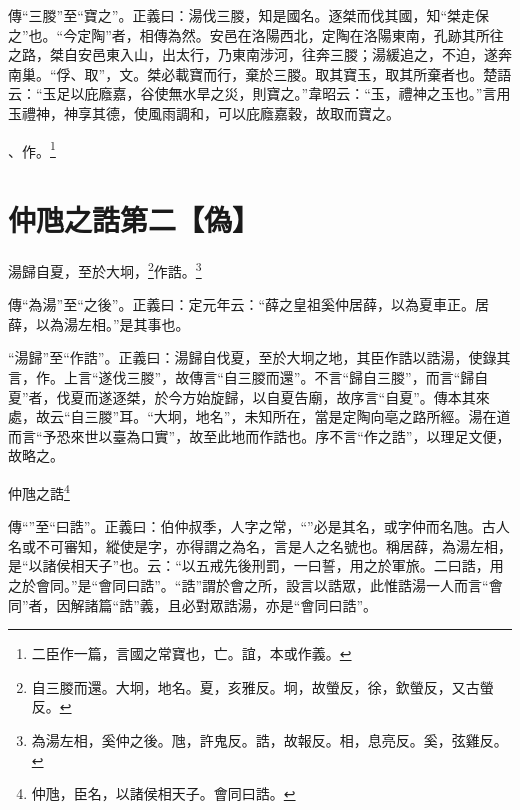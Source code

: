 {\noindent\shu{}\fzkt 傳“三朡”至“寶之”。正義曰：湯伐三朡，知是國名。逐桀而伐其國，知“桀走保之”也。“今定陶”者，相傳為然。安邑在洛陽西北，定陶在洛陽東南，孔跡其所往之路，桀自安邑東入山，出太行，乃東南涉河，往奔三朡；湯緩追之，不迫，遂奔南巢。“俘、取”，文。桀必載寶而行，棄於三朡。取其寶玉，取其所棄者也。楚語云：“玉足以庇廕嘉，谷使無水旱之災，則寶之。”韋昭云：“玉，禮神之玉也。”言用玉禮神，神享其德，使風雨調和，可以庇廕嘉穀，故取而寶之。 \par}

、作。\footnote{二臣作一篇，言國之常寶也，亡。誼，本或作義。}

\section{仲虺之誥第二【偽】}

湯歸自夏，至於大坰，\footnote{自三朡而還。大坰，地名。夏，亥雅反。坰，故螢反，徐，欽螢反，又古螢反。}作誥。\footnote{為湯左相，奚仲之後。虺，許鬼反。誥，故報反。相，息亮反。奚，弦雞反。}


{\noindent\zhuan{}\fzbyks 傳“為湯”至“之後”。正義曰：定元年云：“薛之皇祖奚仲居薛，以為夏車正。居薛，以為湯左相。”是其事也。 \par}

{\noindent\shu{}\fzkt “湯歸”至“作誥”。正義曰：湯歸自伐夏，至於大坰之地，其臣作誥以誥湯，使錄其言，作。上言“遂伐三朡”，故傳言“自三朡而還”。不言“歸自三朡”，而言“歸自夏”者，伐夏而遂逐桀，於今方始旋歸，以自夏告廟，故序言“自夏”。傳本其來處，故云“自三朡”耳。“大坰，地名”，未知所在，當是定陶向亳之路所經。湯在道而言“予恐來世以臺為口實”，故至此地而作誥也。序不言“作之誥”，以理足文便，故略之。 \par}

仲虺之誥\footnote{仲虺，臣名，以諸侯相天子。會同曰誥。}


{\noindent\zhuan{}\fzbyks 傳“”至“曰誥”。正義曰：伯仲叔季，人字之常，“”必是其名，或字仲而名虺。古人名或不可審知，縱使是字，亦得謂之為名，言是人之名號也。稱居薛，為湯左相，是“以諸侯相天子”也。云：“以五戒先後刑罰，一曰誓，用之於軍旅。二曰誥，用之於會同。”是“會同曰誥”。“誥”謂於會之所，設言以誥眾，此惟誥湯一人而言“會同”者，因解諸篇“誥”義，且必對眾誥湯，亦是“會同曰誥”。 \par}

